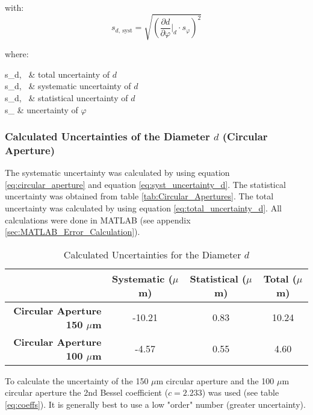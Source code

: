 with:
\begin{equation}
s_{d,\ \text{syst}}=\sqrt{\left(\frac{\partial d}{\partial \varphi}\Biggr|_{d}\cdot s_{\varphi}\right)^2}
\label{eq:syst_uncertainty_d}
\end{equation}

where:
\begin{conditions}
	s_{d,\ } & total uncertainty of $d$ \\
	s_{d,\ } & systematic uncertainty of $d$ \\
	s_{d,\ } & statistical uncertainty of $d$ \\
	s_{\varphi} & uncertainty of $\varphi$
\end{conditions}

\subsubsection{Calculated Uncertainties of the Diameter $d$ (Circular Aperture)}
\label{subsubsec:Uncertainty_Diameter_Circular-Aperture}

The systematic uncertainty was calculated by using equation \ref{eq:circular_aperture} and equation \ref{eq:syst_uncertainty_d}. The statistical uncertainty was obtained from table \ref{tab:Circular_Apertures}. The total uncertainty was calculated by using equation \ref{eq:total_uncertainty_d}. All calculations were done in MATLAB (see appendix \ref{sec:MATLAB_Error_Calculation}).

\begin{table}[H]
	\centering
	\renewcommand{\arraystretch}{1.3}
	\begin{tabular}{r||c|c|c}
		& \textbf{Systematic} ($\mu$m) & \textbf{Statistical} ($\mu$m) & \textbf{Total} ($\mu$m) \\
		\hline\hline
		\textbf{Circular Aperture 150 $\mu$m} & -10.21 & 0.83 & 10.24 \\
		\textbf{Circular Aperture 100 $\mu$m} & -4.57 & 0.55 & 4.60 \\
	\end{tabular}
	\caption{Calculated Uncertainties for the Diameter $d$}
	\label{tab:Calculated_Uncertainties_Diameter}
\end{table}

To calculate the uncertainty of the 150 $\mu$m circular aperture and the 100 $\mu$m circular aperture the 2nd Bessel coefficient ($c = 2.233$) was used (see table \ref{eq:coeffs}). It is generally best to use a low "order" number (greater uncertainty).

